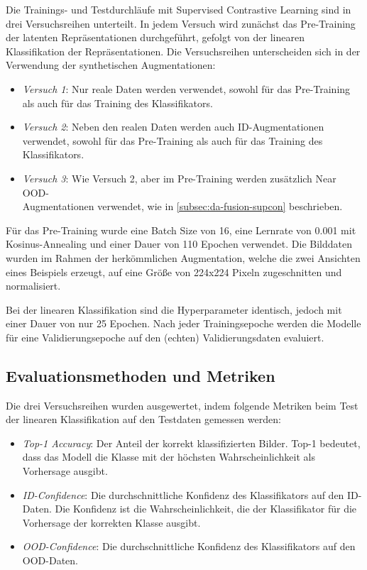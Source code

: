 Die Trainings- und Testdurchläufe mit Supervised Contrastive Learning sind in drei Versuchsreihen unterteilt. In jedem Versuch wird zunächst das Pre-Training der latenten Repräsentationen durchgeführt, gefolgt von der linearen Klassifikation der Repräsentationen. Die Versuchsreihen unterscheiden sich in der Verwendung der synthetischen Augmentationen:

\begin{itemize} %
	\item \emph{Versuch 1}: Nur reale Daten werden verwendet, sowohl für das Pre-Training als auch für das Training des Klassifikators.
	\item \emph{Versuch 2}: Neben den realen Daten werden auch ID-Augmentationen verwendet, sowohl für das Pre-Training als auch für das Training des Klassifikators.
	\item \emph{Versuch 3}: Wie Versuch 2, aber im Pre-Training werden zusätzlich Near OOD-\\Augmentationen verwendet, wie in \autoref{subsec:da-fusion-supcon} beschrieben.
\end{itemize}

Für das Pre-Training wurde eine Batch Size von 16, eine Lernrate von 0.001 mit Kosinus-Annealing und einer Dauer von 110 Epochen verwendet. Die Bilddaten wurden im Rahmen der herkömmlichen Augmentation, welche die zwei Ansichten eines Beispiels erzeugt, auf eine Größe von 224x224 Pixeln zugeschnitten und normalisiert.

Bei der linearen Klassifikation sind die Hyperparameter identisch, jedoch mit einer Dauer von nur 25 Epochen. Nach jeder Trainingsepoche werden die Modelle für eine Validierungsepoche auf den (echten) Validierungsdaten evaluiert.

\subsection{Evaluationsmethoden und Metriken} \label{subsec:evaluation}

Die drei Versuchsreihen wurden ausgewertet, indem folgende Metriken beim Test der linearen Klassifikation auf den Testdaten gemessen werden:

\begin{itemize}
	\item \emph{Top-1 Accuracy}: Der Anteil der korrekt klassifizierten Bilder. Top-1 bedeutet, dass das Modell die Klasse mit der höchsten Wahrscheinlichkeit als Vorhersage ausgibt.
	\item \emph{ID-Confidence}: Die durchschnittliche Konfidenz des Klassifikators auf den ID-Daten. Die Konfidenz ist die Wahrscheinlichkeit, die der Klassifikator für die Vorhersage der korrekten Klasse ausgibt.
	\item \emph{OOD-Confidence}: Die durchschnittliche Konfidenz des Klassifikators auf den OOD-Daten.
\end{itemize}

